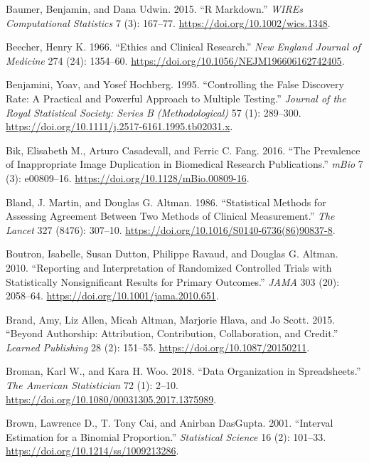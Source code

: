 \documentclass[
]{book}
\newlength{\cslhangindent}
\newenvironment{CSLReferences}[2] %
 {\begin{list}{}{%
  \setlength{\itemindent}{0pt}
  \setlength{\leftmargin}{0pt}
  \setlength{\parsep}{0pt}
  \ifodd #1
   \setlength{\leftmargin}{\cslhangindent}
   \setlength{\itemindent}{-1\cslhangindent}
  \fi
  \setlength{\itemsep}{#2\baselineskip}}}
 {\end{list}}
\begin{document}
\begin{CSLReferences}{1}{1}
Baumer, Benjamin, and Dana Udwin. 2015. {``R Markdown.''} \emph{WIREs Computational Statistics} 7 (3): 167--77. \url{https://doi.org/10.1002/wics.1348}.

Beecher, Henry K. 1966. {``Ethics and Clinical Research.''} \emph{New England Journal of Medicine} 274 (24): 1354--60. \url{https://doi.org/10.1056/NEJM196606162742405}.

Benjamini, Yoav, and Yosef Hochberg. 1995. {``Controlling the False Discovery Rate: A Practical and Powerful Approach to Multiple Testing.''} \emph{Journal of the Royal Statistical Society: Series B (Methodological)} 57 (1): 289--300. \url{https://doi.org/10.1111/j.2517-6161.1995.tb02031.x}.

Bik, Elisabeth M., Arturo Casadevall, and Ferric C. Fang. 2016. {``The Prevalence of Inappropriate Image Duplication in Biomedical Research Publications.''} \emph{mBio} 7 (3): e00809--16. \url{https://doi.org/10.1128/mBio.00809-16}.

Bland, J. Martin, and Douglas G. Altman. 1986. {``Statistical Methods for Assessing Agreement Between Two Methods of Clinical Measurement.''} \emph{The Lancet} 327 (8476): 307--10. \url{https://doi.org/10.1016/S0140-6736(86)90837-8}.

Boutron, Isabelle, Susan Dutton, Philippe Ravaud, and Douglas G. Altman. 2010. {``Reporting and Interpretation of Randomized Controlled Trials with Statistically Nonsignificant Results for Primary Outcomes.''} \emph{JAMA} 303 (20): 2058--64. \url{https://doi.org/10.1001/jama.2010.651}.

Brand, Amy, Liz Allen, Micah Altman, Marjorie Hlava, and Jo Scott. 2015. {``Beyond Authorship: Attribution, Contribution, Collaboration, and Credit.''} \emph{Learned Publishing} 28 (2): 151--55. \url{https://doi.org/10.1087/20150211}.

Broman, Karl W., and Kara H. Woo. 2018. {``Data Organization in Spreadsheets.''} \emph{The American Statistician} 72 (1): 2--10. \url{https://doi.org/10.1080/00031305.2017.1375989}.

Brown, Lawrence D., T. Tony Cai, and Anirban DasGupta. 2001. {``Interval Estimation for a Binomial Proportion.''} \emph{Statistical Science} 16 (2): 101--33. \url{https://doi.org/10.1214/ss/1009213286}.


\end{CSLReferences}
\end{document}
